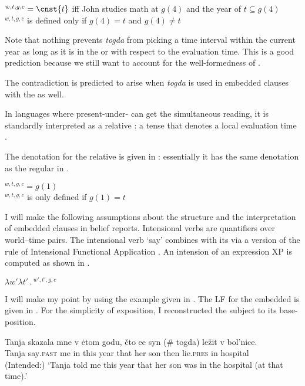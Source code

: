 \documentclass[output=paper,modfonts,newtxmath,hidelinks]{langscibook}
\begin{document}
\ea {}$^{w,t,g,c}=\cnst{t}$ iff John studies math at $g(4)$ and the year of $t\subseteq g(4)$\smallskip\\
$^{w,t,g,c}$ is defined only if $g(4)=t$ and $g(4)\neq t$\label{20:ex28}
\z

\noindent Note that nothing prevents \textit{togda} from picking a time interval within the current year as long as it is in the  or  with respect to the evaluation time. This is a good prediction because we still want to account for the well-formedness of .

The contradiction is predicted to arise when \textit{togda} is used in embedded clauses with the  as well.

In languages where present-under- can get the simultaneous reading, it is standardly interpreted as a relative : a tense that denotes a local evaluation time \citep{Ogihara1989,vonStechow1995propertreatmenttense,OgiharaSharvit2012}.

The denotation for the relative  is given in : essentially it has the same denotation as the regular  in .

\ea {}$^{w,t,g,c}=g(1)$\smallskip\\
$^{w,t,g,c}$ is only defined if $g(1)=t$\label{20:ex29}
\z

\noindent I will make the following assumptions about the structure and the interpretation of embedded clauses in belief reports. Intensional verbs are quantifiers over world--time pairs. The intensional verb ‘say’ combines with its  via a version of the rule of Intensional Functional Application \citep{Heim-Kratzer1998}. An intension of an expression XP is computed as shown in .

\ea $\lambda w'\lambda t'\,.\,{}$$^{w',t',g,c}$\label{20:ex30}
\z

\noindent I will make my point by using the example given in . The LF for the embedded  is given in . For the simplicity of exposition, I reconstructed the subject to its base-position.

\ea \label{20:ex31}
\gll Tanja skazala mne v ėtom godu, čto ee syn (\#\hspace{-2pt} togda) ležit v bol’nice.\\
     Tanja say\textsc{.past} me in this year that her son {} then lie\textsc{.pres} in hospital\\
\glt (Intended:) `Tanja told me this year that her son was in the hospital (at that time).'
\z
\end{document}
